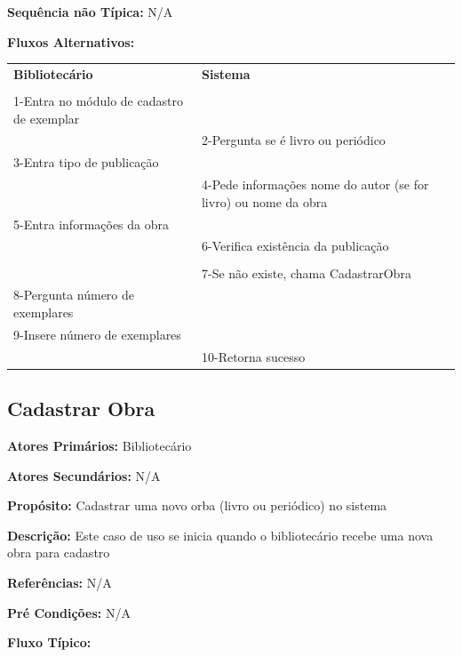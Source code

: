 \documentclass[
	12pt,				%
	openright,			%
	oneside,			%
	a4paper,			%
	english,			%
	brazil				%
	]{abntex2}
\begin{document}
\textbf{Sequência não Típica:}	N/A

\textbf{Fluxos Alternativos:}

\begin{table}[H]
\ABNTEXfontereduzida
\begin{center}
\begin{tabular}{p{5.5cm} p{5.5cm}}
    \textbf{Bibliotecário} & \textbf{Sistema}\\
     & \\
     1-Entra no módulo de cadastro de exemplar & \\
      & 2-Pergunta se é livro ou periódico \\
     3-Entra tipo de publicação & \\
       & 4-Pede informações nome do autor (se for livro) ou nome da obra\\
     5-Entra informações da obra & \\
       & 6-Verifica existência da publicação\\       
       & \\
       & 7-Se não existe, chama CadastrarObra\\
     8-Pergunta número de exemplares & \\             
     9-Insere número de exemplares\\  
      & 10-Retorna sucesso\\
\end{tabular}
\end{center}
\end{table}

\subsection{Cadastrar Obra}

\textbf{Atores Primários:}       Bibliotecário

\textbf{Atores Secundários:}    N/A

\textbf{Propósito:}            Cadastrar uma novo orba (livro ou periódico) no sistema

\textbf{Descrição:}              Este caso de uso se inicia quando o bibliotecário recebe uma nova obra para cadastro

\textbf{Referências:}	N/A 

\textbf{Pré Condições:}          N/A 

\textbf{Fluxo Típico:}
\end{document}
